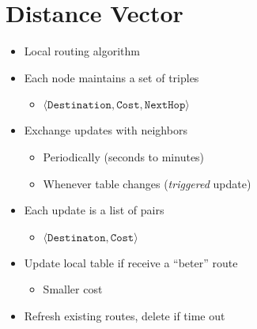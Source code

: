 \section{Distance Vector}
\begin{itemize}[nosep]
    \item Local routing algorithm
    \item Each  node maintains a set of triples
          \begin{itemize}[nosep]
              \item $\langle\texttt{Destination}, \texttt{Cost}, \texttt{NextHop}\rangle$
          \end{itemize}
    \item Exchange updates with neighbors
          \begin{itemize}[nosep]
              \item Periodically (seconds to minutes)
              \item Whenever table changes (\emph{triggered} update)
          \end{itemize}
    \item Each update is a list of pairs
          \begin{itemize}[nosep]
              \item $\langle\texttt{Destinaton}, \texttt{Cost}\rangle$
          \end{itemize}
    \item Update local table if receive a ``beter'' route
          \begin{itemize}[nosep]
              \item Smaller cost
          \end{itemize}
    \item Refresh existing routes, delete if time out
\end{itemize}

